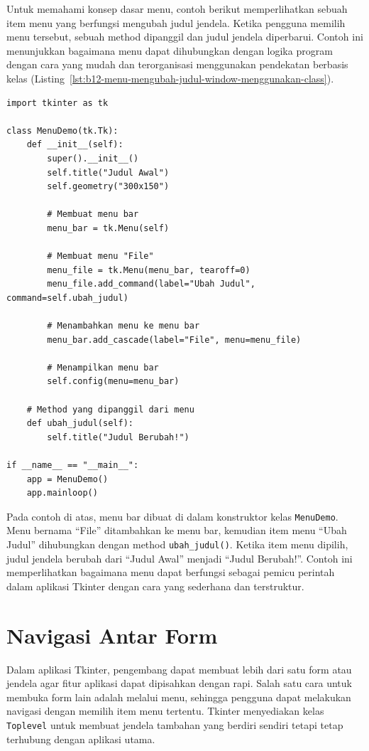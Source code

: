 Untuk memahami konsep dasar menu, contoh berikut memperlihatkan sebuah item menu yang berfungsi mengubah judul jendela. Ketika pengguna memilih menu tersebut, sebuah method dipanggil dan judul jendela diperbarui. Contoh ini menunjukkan bagaimana menu dapat dihubungkan dengan logika program dengan cara yang mudah dan terorganisasi menggunakan pendekatan berbasis kelas (Listing~\ref{lst:b12-menu-mengubah-judul-window-menggunakan-class}).

\begin{lstlisting}[style=PythonStyle, caption={Contoh Menu untuk Mengubah Judul Window Menggunakan Class}, label={lst:b12-menu-mengubah-judul-window-menggunakan-class}]
import tkinter as tk

class MenuDemo(tk.Tk):
    def __init__(self):
        super().__init__()
        self.title("Judul Awal")
        self.geometry("300x150")

        # Membuat menu bar
        menu_bar = tk.Menu(self)

        # Membuat menu "File"
        menu_file = tk.Menu(menu_bar, tearoff=0)
        menu_file.add_command(label="Ubah Judul", command=self.ubah_judul)

        # Menambahkan menu ke menu bar
        menu_bar.add_cascade(label="File", menu=menu_file)

        # Menampilkan menu bar
        self.config(menu=menu_bar)

    # Method yang dipanggil dari menu
    def ubah_judul(self):
        self.title("Judul Berubah!")

if __name__ == "__main__":
    app = MenuDemo()
    app.mainloop()
\end{lstlisting}

Pada contoh di atas, menu bar dibuat di dalam konstruktor kelas \texttt{MenuDemo}. Menu bernama “File” ditambahkan ke menu bar, kemudian item menu “Ubah Judul” dihubungkan dengan method \texttt{ubah\_judul()}. Ketika item menu dipilih, judul jendela berubah dari “Judul Awal” menjadi “Judul Berubah!”. Contoh ini memperlihatkan bagaimana menu dapat berfungsi sebagai pemicu perintah dalam aplikasi Tkinter dengan cara yang sederhana dan terstruktur.


\section{Navigasi Antar Form}

Dalam aplikasi Tkinter, pengembang dapat membuat lebih dari satu form atau jendela agar fitur aplikasi dapat dipisahkan dengan rapi. Salah satu cara untuk membuka form lain adalah melalui menu, sehingga pengguna dapat melakukan navigasi dengan memilih item menu tertentu. Tkinter menyediakan kelas \texttt{Toplevel} untuk membuat jendela tambahan yang berdiri sendiri tetapi tetap terhubung dengan aplikasi utama.

